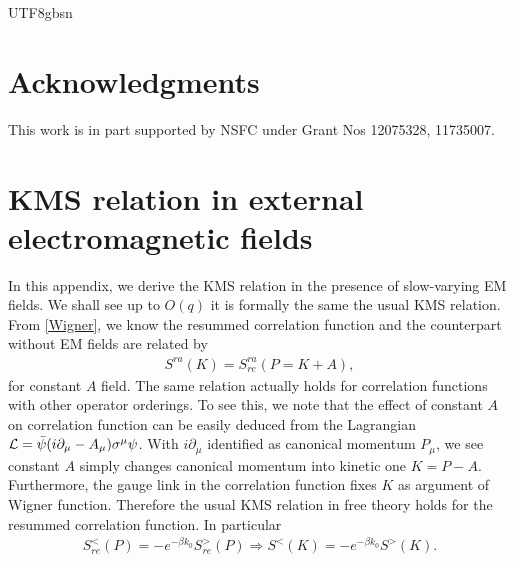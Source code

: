 \documentclass[11pt]{article}\def\baselinestretch{1.4}
\def\b{{\beta}}
\def\m{{\mu}}
\def\s{{\sigma}}
\newcommand{\pd}{{\partial}}
\begin{document}
\begin{CJK}{UTF8}{gbsn}
\section*{Acknowledgments}
This work is in part supported by NSFC under Grant Nos 12075328, 11735007.

\appendix


\section{KMS relation in external electromagnetic fields}\label{sec_app_B}

In this appendix, we derive the KMS relation in the presence of slow-varying EM fields. We shall see up to $O(q)$ it is formally the same the usual KMS relation. From \eqref{Wigner}, we know the resummed correlation function and the counterpart without EM fields are related by
\begin{align}
S^{ra}(K)=S_{re}^{ra}(P=K+A),
\end{align}
for constant $A$ field. The same relation actually holds for correlation functions with other operator orderings. To see this, we note that the effect of constant $A$ on correlation function can be easily deduced from the Lagrangian ${\cal L}=\bar{\psi}(i\pd_\m-A_\m)\s^\m\psi$. With $i\pd_\m$ identified as canonical momentum $P_\m$, we see constant $A$ simply changes canonical momentum into kinetic one $K=P-A$. Furthermore, the gauge link in the correlation function fixes $K$ as argument of Wigner function. Therefore the usual KMS relation in free theory holds for the resummed correlation function. In particular
\begin{align}
S_{re}^<(P)=-e^{-\b k_0}S_{re}^>(P)\Rightarrow S^<(K)=-e^{-\b k_0}S^>(K).
\end{align}


\end{CJK}
\end{document}
